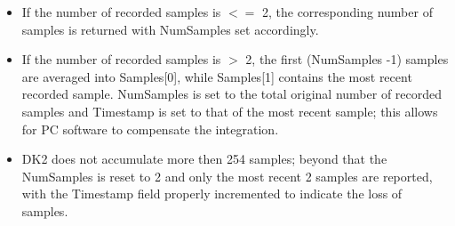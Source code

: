 \documentclass[letterpaper]{article}
\begin{document}
\begin{itemize}
  \item If the number of recorded samples is $<=$ 2, the corresponding number
   of samples is returned with NumSamples set accordingly.
  \item If the number of recorded samples is $>$ 2, the first (NumSamples -1) samples
   are averaged into Samples[0], while Samples[1] contains the most recent recorded sample.
   NumSamples is set to the total original number of
   recorded samples and Timestamp is set to that of the most recent sample; this allows for PC software to compensate the integration.
  \item DK2 does not accumulate more then 254 samples; beyond that the
   NumSamples is reset to 2 and only the most recent 2 samples are reported, with the Timestamp field properly incremented to indicate the loss of samples.
\end{itemize}
\end{document}
